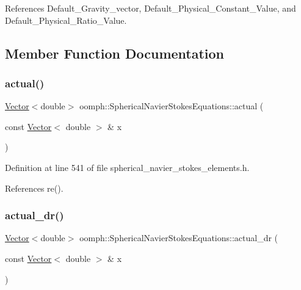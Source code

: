 References Default\+\_\+\+Gravity\+\_\+vector, Default\+\_\+\+Physical\+\_\+\+Constant\+\_\+\+Value, and Default\+\_\+\+Physical\+\_\+\+Ratio\+\_\+\+Value.



\subsection{Member Function Documentation}
\mbox{\label{classoomph_1_1SphericalNavierStokesEquations_afefe6d1cb0f2c3790b4189ef6743486c}} 
\subsubsection{\texorpdfstring{actual()}{actual()}}
{\footnotesize\ttfamily \hyperlink{classoomph_1_1Vector}{Vector}$<$double$>$ oomph\+::\+Spherical\+Navier\+Stokes\+Equations\+::actual (\begin{DoxyParamCaption}\item[{const \hyperlink{classoomph_1_1Vector}{Vector}$<$ double $>$ \&}]{x }\end{DoxyParamCaption})\hspace{0.3cm}{\ttfamily [inline]}}



Definition at line 541 of file spherical\+\_\+navier\+\_\+stokes\+\_\+elements.\+h.



References re().

\mbox{\label{classoomph_1_1SphericalNavierStokesEquations_a7e45e6a6b85ad039a022c369363c4b70}} 
\subsubsection{\texorpdfstring{actual\+\_\+dr()}{actual\_dr()}}
{\footnotesize\ttfamily \hyperlink{classoomph_1_1Vector}{Vector}$<$double$>$ oomph\+::\+Spherical\+Navier\+Stokes\+Equations\+::actual\+\_\+dr (\begin{DoxyParamCaption}\item[{const \hyperlink{classoomph_1_1Vector}{Vector}$<$ double $>$ \&}]{x }\end{DoxyParamCaption})\hspace{0.3cm}{\ttfamily [inline]}}



